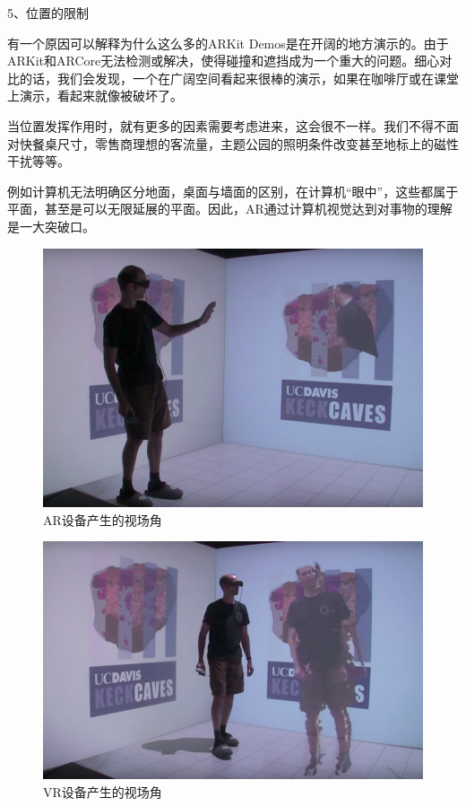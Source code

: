 \documentclass{article}
\begin{document}
5、位置的限制\par

有一个原因可以解释为什么这么多的ARKit Demos是在开阔的地方演示的。由于ARKit和ARCore无法检测或解决，使得碰撞和遮挡成为一个重大的问题。细心对比的话，我们会发现，一个在广阔空间看起来很棒的演示，如果在咖啡厅或在课堂上演示，看起来就像被破坏了。\par

当位置发挥作用时，就有更多的因素需要考虑进来，这会很不一样。我们不得不面对快餐桌尺寸，零售商理想的客流量，主题公园的照明条件改变甚至地标上的磁性干扰等等。\par

例如计算机无法明确区分地面，桌面与墙面的区别，在计算机“眼中”，这些都属于平面，甚至是可以无限延展的平面。因此，AR通过计算机视觉达到对事物的理解是一大突破口。\par
\begin{figure}[h]
	\centering
	\includegraphics[scale=0.4]{AR1}
	\caption{AR设备产生的视场角}
	\label{fig1}
\end{figure}\par\begin{figure}[h]
	\centering
	\includegraphics[scale=0.4]{VR1}
	\caption{VR设备产生的视场角}
	\label{fig2}
\end{figure}\par
\end{document}
